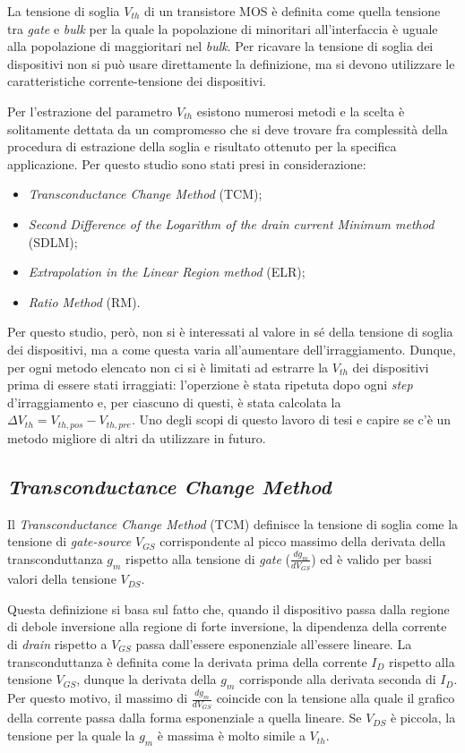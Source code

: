 La tensione di soglia $V_{th}$ di un transistore MOS è definita come quella tensione tra \emph{gate} e \emph{bulk} per la quale la popolazione di minoritari all'interfaccia è uguale alla popolazione di maggioritari nel \emph{bulk}. Per ricavare la tensione di soglia dei dispositivi non si può usare direttamente la definizione, ma si devono utilizzare le caratteristiche corrente-tensione dei dispositivi.

Per l'estrazione del parametro $V_{th}$ esistono numerosi metodi \cite{art2} e la scelta è solitamente dettata da un compromesso che si deve trovare fra complessità della procedura di estrazione della soglia e risultato ottenuto per la specifica applicazione. Per questo studio sono stati presi in considerazione:

\begin{itemize}
  \item \emph{Transconductance Change Method} (TCM);
  \item \emph{Second Difference of the Logarithm of the drain current Minimum method} (SDLM);
  \item \emph{Extrapolation in the Linear Region method} (ELR);
  \item \emph{Ratio Method} (RM).
\end{itemize}

Per questo studio, però, non si è interessati al valore in sé della tensione di soglia dei dispositivi, ma a come questa varia all'aumentare dell'irraggiamento. Dunque, per ogni metodo elencato non ci si è limitati ad estrarre la $V_{th}$ dei dispositivi prima di essere stati irraggiati: l'operzione è stata ripetuta dopo ogni \emph{step} d'irraggiamento e, per ciascuno di questi, è stata calcolata la $\Delta V_{th} = V_{th,pos}-V_{th,pre}$. Uno degli scopi di questo lavoro di tesi e capire se c'è un metodo migliore di altri da utilizzare in futuro.

\subsection[TCM]{\emph{Transconductance Change Method}}
Il \emph{Transconductance Change Method} (TCM) definisce la tensione di soglia come la tensione di \emph{gate-source} $V_{GS}$ corrispondente al picco massimo della derivata della transconduttanza $g_m$ rispetto alla tensione di \emph{gate} ($\frac{dg_m}{dV_ {GS}}$) ed è valido per bassi valori della tensione $V_{DS}$.

Questa definizione si basa sul fatto che, quando il dispositivo passa dalla regione di debole inversione alla regione di forte inversione, la dipendenza della corrente di \emph{drain} rispetto a $V_{GS}$ passa dall'essere esponenziale all'essere lineare.
La transconduttanza è definita come la derivata prima della corrente $I_D$ rispetto alla tensione $V_{GS}$, dunque la derivata della $g_m$ corrisponde alla derivata seconda di $I_D$. Per questo motivo, il massimo di $\frac{dg_m}{dV_{GS}}$ coincide con la tensione alla quale il grafico della corrente passa dalla forma esponenziale a quella lineare. Se $V_{DS}$ è piccola, la tensione per la quale la $g_m$ è massima è molto simile a $V_{th}$.

